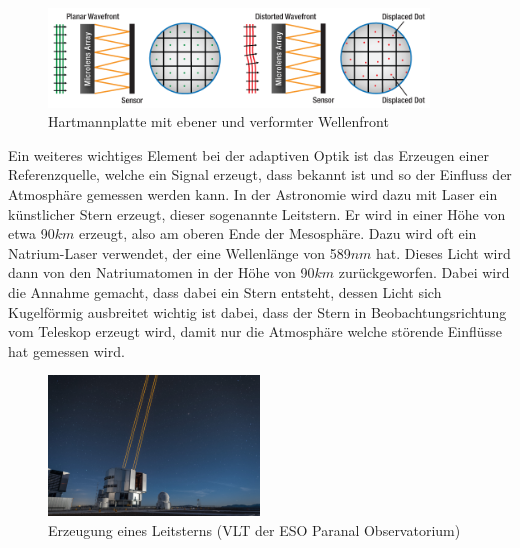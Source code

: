 \begin{refsection}
\begin{figure}
  \centering
  \includegraphics[width=0.9\textwidth]{adaptiv/images/hartmannplatte}
  \caption{Hartmannplatte mit ebener und verformter Wellenfront
    \cite{thor:hartmannplatte}}
  \label{fig:hartmannplatte}
\end{figure}

Ein weiteres wichtiges Element bei der adaptiven Optik ist das Erzeugen einer Referenzquelle, welche ein Signal erzeugt, dass bekannt ist und so der Einfluss der Atmosphäre gemessen werden kann. In der Astronomie wird dazu mit Laser ein künstlicher Stern erzeugt, dieser sogenannte Leitstern. Er wird in einer Höhe von etwa 90$km$ erzeugt, also am oberen Ende der Mesosphäre. Dazu wird oft ein Natrium-Laser verwendet, der eine Wellenlänge von 589$nm$ hat. Dieses Licht wird dann von den Natriumatomen in der Höhe von 90$km$ zurückgeworfen. Dabei wird die Annahme gemacht, dass dabei ein Stern entsteht, dessen Licht sich Kugelförmig ausbreitet wichtig ist dabei, dass der Stern in Beobachtungsrichtung vom Teleskop erzeugt wird, damit nur die Atmosphäre welche störende Einflüsse hat gemessen wird. 

\begin{figure}
  \centering
  \includegraphics[width=0.5\textwidth]{adaptiv/images/Leitstern}
  \caption{Erzeugung eines Leitsterns (VLT der ESO Paranal Observatorium)
    \cite{eso:leitstern}}
  \label{fig:leitstern}
\end{figure}


\end{refsection}

